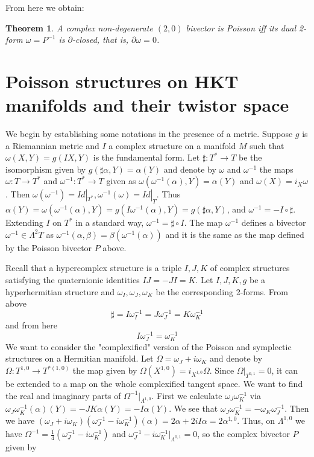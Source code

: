 \documentclass[11pt,oneside,leqno]{amsart}
\theoremstyle{plain}
\newtheorem{theorem}{Theorem}[section]
\theoremstyle{definition}
\begin{document}
From here we obtain:

\begin{theorem}\label{L3}
A complex non-degenerate $(2,0)$ bivector is Poisson iff its dual 2-form $\omega=P^{-1}$ is $\partial$-closed, that is, $\partial\omega=0$.

\end{theorem}

\section{Poisson structures on HKT manifolds and their twistor space}

We begin by establishing some notations in the presence of a metric. Suppose $g$ is a Riemannian metric and $I$ a complex structure on a manifold $M$ such that $\omega(X,Y)=g(IX,Y)$  is the  fundamental form. Let $\sharp: T^* \rightarrow T$ be the isomorphism given by $g(\sharp \alpha, Y)=\alpha(Y)$ and denote by
$\omega$ and $\omega^{-1}$ the maps $\omega:T\rightarrow T^*$ and $\omega^{-1}:T^*\rightarrow T$ given as $\omega(\omega^{-1}(\alpha),Y)=\alpha(Y)$ and $\omega(X) = i_X\omega$. Then $\omega(\omega^{-1})=Id|_{T^*}, \omega^{-1}(\omega)=Id|_{T}$. Thus $\alpha(Y)=\omega(\omega^{-1}(\alpha),Y)=g(I\omega^{-1}(\alpha),Y)=g(\sharp\alpha,Y)$, and $\omega^{-1} = -I\circ \sharp$. Extending $I$ on $T^*$ in a standard way, $\omega^{-1}=\sharp \circ I$. The map $\omega^{-1}$ defines a bivector  $\omega^{-1}\in \Lambda^2T$ as $\omega^{-1}(\alpha, \beta)= \beta(\omega^{-1}(\alpha))$ and it is the same as the map defined by the Poisson bivector $P$ above.

Recall that a hypercomplex structure is a triple $I,J,K$ of complex structures satisfying the quaternionic identities $IJ=-JI=K$.
Let $I,J,K,g$ be  a hyperhermitian structure and $\omega_I,\omega_J,\omega_K$ be the corresponding 2-forms. From above
$$ \sharp = I\omega^{-1}_I  = J\omega^{-1}_J = K\omega^{-1}_K $$ and from here $$I \omega^{-1}_J = \omega^{-1}_K$$
We want to consider the "complexified" version of the Poisson and symplectic structures on a Hermitian manifold. Let $\Omega = \omega_J+i\omega_K$ and denote by $\Omega: T^{1,0}\rightarrow T^{*(1,0)}$ the map given by $\Omega(X^{1,0})= i_{X^{1,0}}\Omega$. Since $\Omega|_{T^{0,1}} = 0$, it can be extended to a map on the whole complexified tangent space. We want to find the real and imaginary parts of $\Omega^{-1}|_{\Lambda^{1,0}}$. First we calculate $\omega_J\omega^{-1}_K$ via  $\omega_J\omega^{-1}_K(\alpha)(Y) = -JK\alpha(Y) = -I\alpha(Y)$. We see that $\omega_J\omega^{-1}_K = - \omega_K\omega^{-1}_J$. Then we have $(\omega_J+i\omega_K)(\omega^{-1}_J-i\omega^{-1}_K) (\alpha) = 2\alpha+2iI\alpha = 2\alpha^{1,0}$. Thus, on $\Lambda^{1,0}$ we have $\Omega^{-1}= \frac{1}{4}(\omega^{-1}_J-i\omega^{-1}_K)$ and $\omega^{-1}_J-i\omega^{-1}_K |_{\Lambda^{0,1}} = 0$, so the complex bivector $P$ given by
\end{document}
